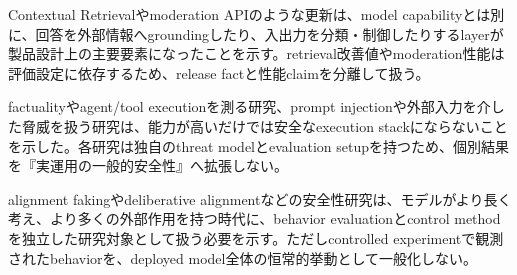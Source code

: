 Contextual Retrievalやmoderation APIのような更新は、model capabilityとは別に、回答を外部情報へgroundingしたり、入出力を分類・制御したりするlayerが製品設計上の主要要素になったことを示す。retrieval改善値やmoderation性能は評価設定に依存するため、release factと性能claimを分離して扱う。\autocite{src-308d34e54e69,src-33d811167435}


factualityやagent/tool executionを測る研究、prompt injectionや外部入力を介した脅威を扱う研究は、能力が高いだけでは安全なexecution stackにならないことを示した。各研究は独自のthreat modelとevaluation setupを持つため、個別結果を『実運用の一般的安全性』へ拡張しない。\autocite{src-e7b786f4a622,src-f96e45232e1f}


alignment fakingやdeliberative alignmentなどの安全性研究は、モデルがより長く考え、より多くの外部作用を持つ時代に、behavior evaluationとcontrol methodを独立した研究対象として扱う必要を示す。ただしcontrolled experimentで観測されたbehaviorを、deployed model全体の恒常的挙動として一般化しない。\autocite{src-3278a129a17e,src-9cf289b414fd,src-e92e95daf8e0}


